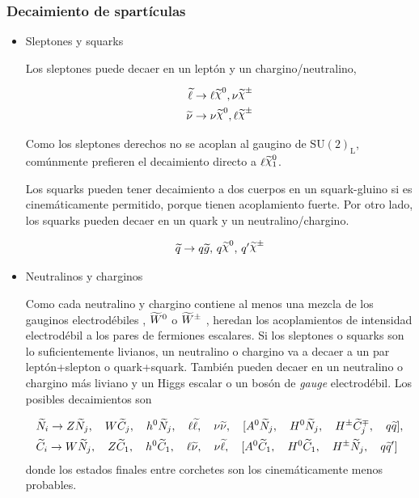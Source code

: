 \subsubsection{Decaimiento de spartículas}

\begin{itemize}\itemsep0.2cm\parskip0.2cm

\item Sleptones y squarks

Los sleptones puede decaer en un leptón y un chargino/neutralino,

\begin{align}
  \slepton &\to \ell \nino, \nu\chinopm \\ \snu &\to \nu\nino, \ell\chinopm
\end{align}

Como los sleptones derechos no se acoplan al gaugino de $\text{SU}(2)_\text{L}$,
comúnmente prefieren el decaimiento directo a $\ell\ninoone$.

Los squarks pueden tener decaimiento a dos cuerpos en un squark-gluino si es
cinemáticamente permitido, porque tienen acoplamiento fuerte. Por otro
lado, los squarks pueden decaer en un quark y un neutralino/chargino.

\begin{equation}
  \susy{q} \to q\gluino, \, q\nino, \, q^\prime \chinopm
\end{equation}


\item Neutralinos y charginos

Como cada neutralino y chargino contiene al menos una mezcla de los gauginos
electrodébiles {\bino}, $\widetilde{W}^0$ o $\widetilde{W}^{\pm}$ , heredan los
acoplamientos de intensidad electrodébil a los pares de fermiones escalares. Si
los sleptones o squarks son lo suficientemente livianos, un neutralino o
chargino va a decaer a un par leptón+slepton o quark+squark. También pueden
decaer en un neutralino o chargino más liviano y un Higgs escalar o un bosón
de \emph{gauge} electrodébil. Los posibles decaimientos son

\begin{align}
  &\widetilde{N}_i \rightarrow Z \widetilde{N}_j, \quad W \widetilde{C}_j, \quad h^0 \widetilde{N}_j, \quad
  \ell \widetilde{\ell}, \quad \nu \widetilde{\nu}, \quad [A^0 \widetilde{N}_j, \quad H^0
    \widetilde{N}_j, \quad H^{\pm} \widetilde{C}_j^{\mp}, \quad q \widetilde{q}],
  \\ &\widetilde{C}_i \rightarrow W \widetilde{N}_j, \quad Z \widetilde{C}_1, \quad h^0 \widetilde{C}_1,
  \quad \ell \widetilde{\nu}, \quad \nu \widetilde{\ell}, \quad [A^0 \widetilde{C}_1, \quad H^0
    \widetilde{C}_1, \quad H^{\pm} \widetilde{N}_j, \quad q \widetilde{q}']
\end{align}
%
donde los estados finales entre corchetes son los cinemáticamente menos
probables.



\end{itemize}
